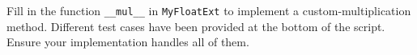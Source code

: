 \question
Fill in the function \texttt{\_\_mul\_\_} in \texttt{MyFloatExt} to implement a custom-multiplication method. Different test cases have been provided at the bottom of the script. Ensure your implementation handles all of them.
